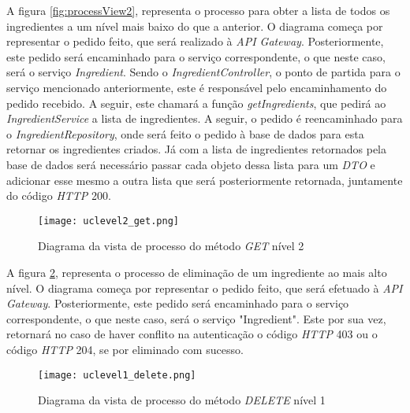 A figura \ref{fig:processView2}, representa o processo  para obter a lista de todos os ingredientes a um nível mais baixo do que a anterior. O diagrama começa por representar o pedido feito, que será realizado à \textit{API Gateway}. Posteriormente, este pedido será encaminhado para o serviço correspondente, o que neste caso, será o serviço \textit{Ingredient}. Sendo o \textit{IngredientController}, o ponto de partida para o serviço mencionado anteriormente, este é responsável pelo encaminhamento do pedido recebido. A seguir, este chamará a função \textit{getIngredients}, que pedirá ao \textit{IngredientService} a lista de ingredientes. A seguir, o pedido é reencaminhado para o \textit{IngredientRepository}, onde será feito o pedido à base de dados para esta retornar os ingredientes criados. Já com a lista de ingredientes retornados pela base de dados será necessário passar cada objeto dessa lista para um \textit{DTO} e adicionar esse mesmo a outra lista que será posteriormente retornada, juntamente do código \textit{HTTP} 200.

\begin{figure}[H]
    \centering
    \texttt{[image: uclevel2\_get.png]}
    \caption{Diagrama da vista de processo do método \textit{GET} nível 2}
    \label{fig:processGET2}
\end{figure}

A figura \ref{fig:processDELETE1}, representa o processo de eliminação de um ingrediente ao mais alto nível. O diagrama começa por representar o pedido feito, que será efetuado à \textit{API Gateway}. Posteriormente, este pedido será encaminhado para o serviço correspondente, o que neste caso, será o serviço "Ingredient". Este por sua vez, retornará no caso de haver conflito na autenticação o código \textit{HTTP} 403 ou o código \textit{HTTP} 204, se por eliminado com sucesso.


\begin{figure}[H]
    \centering
    \texttt{[image: uclevel1\_delete.png]}
    \caption{Diagrama da vista de processo do método \textit{DELETE} nível 1}
    \label{fig:processDELETE1}
\end{figure}


